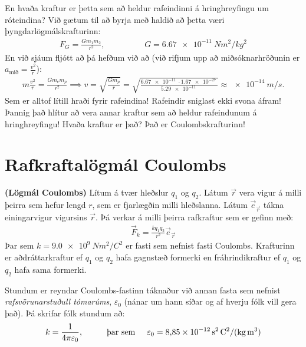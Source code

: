 En hvaða kraftur er þetta sem að heldur rafeindinni á hringhreyfingu um róteindina? Við gætum til að byrja með haldið að þetta væri þyngdarlögmálskrafturinn:
\begin{align*}
    F_G = \frac{Gm_1m_2}{r^2}, \hspace{2cm} G = \SI{6.67e-11}{Nm^2/kg^2}
\end{align*}
En við sjáum fljótt að þá hefðum við að (við rifjum upp að miðsóknarhröðunin er $a_{\text{mið}} = \frac{v^2}{r}$):
\begin{align*}
    m \frac{v^2}{r} = \frac{Gm_e m_p}{r^2} \implies v = \sqrt{\frac{Gm_p}{r}} = \sqrt{\frac{\SI{6.67e-11}{}\cdot \SI{1.67e-27}{}}{\SI{5.29e-11}{}}} \approx \SI{e-14}{m/s}.
\end{align*}
Sem er alltof lítill hraði fyrir rafeindina! Rafeindir sniglast ekki svona áfram! Þannig það hlítur að vera annar kraftur sem að heldur rafeindunum á hringhreyfingu! Hvaða kraftur er það? Það er Coulombskrafturinn!


\section{Rafkraftalögmál Coulombs}

\begin{tcolorbox}
\begin{theorem}
\textbf{(Lögmál Coulombs)} Lítum á tvær hleðslur $q_1$ og $q_2$. Látum $\Vec{r}$ vera vigur á milli þeirra sem hefur lengd $r$, sem er fjarlægðin milli hleðslanna. Látum $\Vec{e}_{\vec{r}}$ tákna einingarvigur vigursins $\Vec{r}$. Þá verkar á milli þeirra rafkraftur sem er gefinn með:
\begin{align*}
    \vec{F}_k = \frac{kq_1 q_2}{r^2} \Vec{e}_{\vec{r}}
\end{align*}
Þar sem $k = \SI{9.0e9}{Nm^2/C^2}$ er fasti sem nefnist fasti Coulombs. Krafturinn er aðdráttarkraftur ef $q_1$ og $q_2$ hafa gagnstæð formerki en fráhrindikraftur ef $q_1$ og $q_2$ hafa sama formerki.
\end{theorem}
\end{tcolorbox}

Stundum er reyndar Coulombs-fastinn táknaður við annan fasta sem nefnist \textit{rafsvörunarstuðull tómarúms}, $\varepsilon_0$ (nánar um hann síðar og af hverju fólk vill gera það). Þá skrifar fólk stundum að:
\begin{align*}
    k = \frac{1}{4\pi \varepsilon_0}, \hspace{1cm} \text{þar sem} \hspace{0.5cm} \varepsilon_0 = \SI{8.85e-12}{s^2.C^2/(kg.m^3)}
\end{align*}


